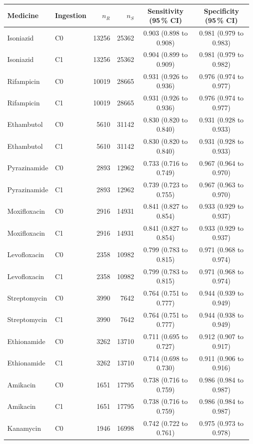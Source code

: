 \begin{tabular}{llrrcc}
\toprule
Medicine & Ingestion & $n_R$ & $n_S$ & Sensitivity (95\,\% CI) & Specificity (95\,\% CI) \\
\midrule
Isoniazid & C0 & 13256 & 25362 & 0.903 (0.898 to 0.908) & 0.981 (0.979 to 0.983) \\
Isoniazid & C1 & 13256 & 25362 & 0.904 (0.899 to 0.909) & 0.981 (0.979 to 0.982) \\
Rifampicin & C0 & 10019 & 28665 & 0.931 (0.926 to 0.936) & 0.976 (0.974 to 0.977) \\
Rifampicin & C1 & 10019 & 28665 & 0.931 (0.926 to 0.936) & 0.976 (0.974 to 0.977) \\
Ethambutol & C0 & 5610 & 31142 & 0.830 (0.820 to 0.840) & 0.931 (0.928 to 0.933) \\
Ethambutol & C1 & 5610 & 31142 & 0.830 (0.820 to 0.840) & 0.931 (0.928 to 0.933) \\
Pyrazinamide & C0 & 2893 & 12962 & 0.733 (0.716 to 0.749) & 0.967 (0.964 to 0.970) \\
Pyrazinamide & C1 & 2893 & 12962 & 0.739 (0.723 to 0.755) & 0.967 (0.963 to 0.970) \\
Moxifloxacin & C0 & 2916 & 14931 & 0.841 (0.827 to 0.854) & 0.933 (0.929 to 0.937) \\
Moxifloxacin & C1 & 2916 & 14931 & 0.841 (0.827 to 0.854) & 0.933 (0.929 to 0.937) \\
Levofloxacin & C0 & 2358 & 10982 & 0.799 (0.783 to 0.815) & 0.971 (0.968 to 0.974) \\
Levofloxacin & C1 & 2358 & 10982 & 0.799 (0.783 to 0.815) & 0.971 (0.968 to 0.974) \\
Streptomycin & C0 & 3990 & 7642 & 0.764 (0.751 to 0.777) & 0.944 (0.939 to 0.949) \\
Streptomycin & C1 & 3990 & 7642 & 0.764 (0.751 to 0.777) & 0.944 (0.938 to 0.949) \\
Ethionamide & C0 & 3262 & 13710 & 0.711 (0.695 to 0.727) & 0.912 (0.907 to 0.917) \\
Ethionamide & C1 & 3262 & 13710 & 0.714 (0.698 to 0.730) & 0.911 (0.906 to 0.916) \\
Amikacin & C0 & 1651 & 17795 & 0.738 (0.716 to 0.759) & 0.986 (0.984 to 0.987) \\
Amikacin & C1 & 1651 & 17795 & 0.738 (0.716 to 0.759) & 0.986 (0.984 to 0.987) \\
Kanamycin & C0 & 1946 & 16998 & 0.742 (0.722 to 0.761) & 0.975 (0.973 to 0.978) \\

\end{tabular}
